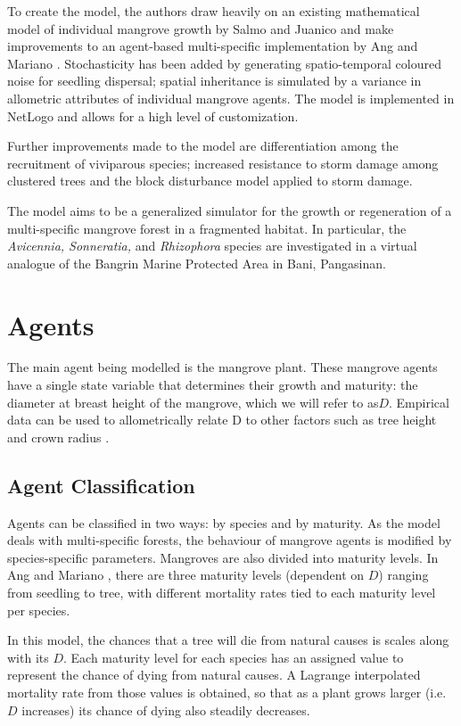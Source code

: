 To create the model, the authors draw heavily on an existing mathematical model
of individual mangrove growth by Salmo and Juanico \cite{SalmoJuanico2015} and make improvements to an agent-based multi-specific implementation by Ang and Mariano \cite{mangrovesAngMariano}. Stochasticity has been added by generating spatio-temporal coloured noise for seedling
dispersal; spatial inheritance is simulated by a variance in allometric attributes of individual mangrove agents. The model is implemented in NetLogo and allows for a high level of customization.

Further improvements made to the model are differentiation among the recruitment of
viviparous species; increased resistance to storm damage among
clustered trees and the block disturbance model applied to storm damage.

The model aims to be a generalized simulator for the growth or regeneration of a
multi-specific mangrove forest in a fragmented habitat. In particular,
the \emph{Avicennia, Sonneratia,} and \emph{Rhizophora} species are
investigated in a virtual analogue of the Bangrin Marine Protected Area in
Bani, Pangasinan.

\section{Agents}

The main agent being modelled is the mangrove plant. These mangrove agents
have a single state variable that determines their growth and maturity:
the diameter at breast height of the mangrove, which we will refer to
as\(D\). Empirical data can be used to allometrically relate D to other
factors such as tree height and crown radius \cite{Hiebeler2000}.

\subsection{Agent Classification}

Agents can be classified in two ways: by species and by maturity. As the
model deals with multi-specific forests, the behaviour of mangrove
agents is modified by species-specific parameters. Mangroves are also
divided into maturity levels. In Ang and Mariano \cite{mangrovesAngMariano}, there are
three maturity levels (dependent on \(D\)) ranging from seedling to tree,
with different mortality rates tied to each maturity level per species.

In this model, the chances that a tree will die from natural causes is 
scales along with its \(D\). Each maturity level for each species has an assigned value
to represent the chance of dying from natural causes.
A Lagrange interpolated mortality rate from those values is obtained, so that as a
plant grows larger (i.e. $D$ increases) its chance of dying also steadily decreases.

